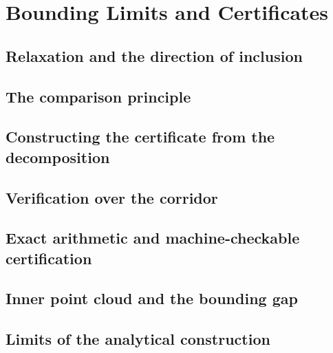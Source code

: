 
\section{Bounding Limits and Certificates}
\label{sec:bounding}

\subsection{Relaxation and the direction of inclusion}
\label{sub:filippov_wazewski_relaxation}

\subsection{The comparison principle}
\label{sub:comparison_principle}

\subsection{Constructing the certificate from the decomposition}
\label{sub:constructing_the_certificate}

\subsection{Verification over the corridor}
\label{sub:verification_over_corridor}

\subsection{Exact arithmetic and machine-checkable certification}
\label{sub:exact_verification}

\subsection{Inner point cloud and the bounding gap}
\label{sub:inner_point_cloud}

\subsection{Limits of the analytical construction}
\label{sub:limits_of_analytical_construction}
